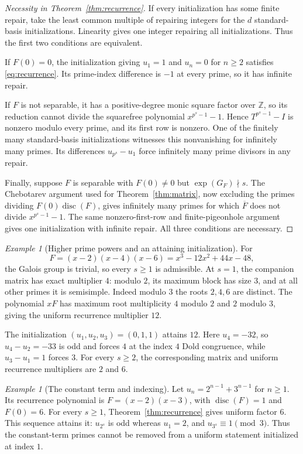 \documentclass[11pt]{article}
\theoremstyle{remark}
\newtheorem{example}[theorem]{Example}
\newcommand{\disc}{\operatorname{disc}}
\newcommand{\Z}{\mathbb Z}
\begin{document}
\begin{proof}[Necessity in Theorem~\ref{thm:recurrence}]
If every initialization has some finite repair, take the least common multiple of repairing integers for the $d$ standard-basis initializations. Linearity gives one integer repairing all initializations. Thus the first two conditions are equivalent.

If $F(0)=0$, the initialization giving $u_1=1$ and $u_n=0$ for $n\geq2$ satisfies \eqref{eq:recurrence}. Its prime-index difference is $-1$ at every prime, so it has infinite repair.

If $F$ is not separable, it has a positive-degree monic square factor over $\Z$, so its reduction cannot divide the squarefree polynomial $x^{p^s-1}-1$. Hence $T^{p^s-1}-I$ is nonzero modulo every prime, and its first row is nonzero. One of the finitely many standard-basis initializations witnesses this nonvanishing for infinitely many primes. Its differences $u_{p^s}-u_1$ force infinitely many prime divisors in any repair.

Finally, suppose $F$ is separable with $F(0)\neq0$ but $\exp(G_F)\nmid s$. The Chebotarev argument used for Theorem~\ref{thm:matrix}, now excluding the primes dividing $F(0)\disc(F)$, gives infinitely many primes for which $\overline F$ does not divide $x^{p^s-1}-1$. The same nonzero-first-row and finite-pigeonhole argument gives one initialization with infinite repair. All three conditions are necessary.
\end{proof}

\begin{example}[Higher prime powers and an attaining initialization]\label{ex:higher}
For
\[
 F=(x-2)(x-4)(x-6)=x^3-12x^2+44x-48,
\]
the Galois group is trivial, so every $s\geq1$ is admissible. At $s=1$, the companion matrix has exact multiplier $4$: modulo $2$, its maximum block has size $3$, and at all other primes it is semisimple. Indeed modulo $3$ the roots $2,4,6$ are distinct. The polynomial $xF$ has maximum root multiplicity $4$ modulo $2$ and $2$ modulo $3$, giving the uniform recurrence multiplier $12$.

The initialization $(u_1,u_2,u_3)=(0,1,1)$ attains $12$. Here $u_4=-32$, so $u_4-u_2=-33$ is odd and forces $4$ at the index $4$ Dold congruence, while $u_3-u_1=1$ forces $3$. For every $s\geq2$, the corresponding matrix and uniform recurrence multipliers are $2$ and $6$.
\end{example}

\begin{example}[The constant term and indexing]\label{ex:initialization}
Let $u_n=2^{n-1}+3^{n-1}$ for $n\geq1$. Its recurrence polynomial is $F=(x-2)(x-3)$, with $\disc(F)=1$ and $F(0)=6$. For every $s\geq1$, Theorem~\ref{thm:recurrence} gives uniform factor $6$. This sequence attains it: $u_{2^s}$ is odd whereas $u_1=2$, and $u_{3^s}\equiv1\pmod3$. Thus the constant-term primes cannot be removed from a uniform statement initialized at index $1$.
\end{example}
\end{document}
